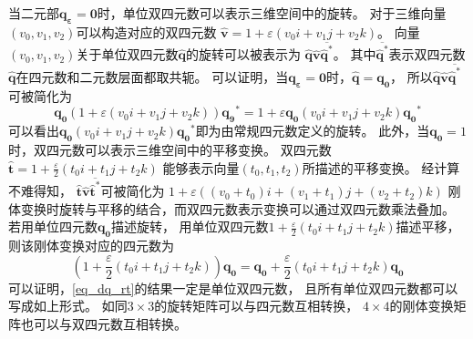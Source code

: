 当二元部$\bm{q_{\varepsilon}}=\bm{0}$时，单位双四元数可以表示三维空间中的旋转。
对于三维向量$(v_0,v_1,v_2)$可以构造对应的双四元数
$\hat{\bm{v}}=1 + \varepsilon (v_0i + v_1j + v_2k)$。
向量$(v_0,v_1,v_2)$关于单位双四元数$\hat{\bm{q}}$的旋转可以被表示为
$\hat{\bm{q}} \hat{\bm{v}} \overline{\hat{\bm{q}}^*}$。
其中$\overline{\hat{\bm{q}}^*}$表示双四元数$\hat{\bm{q}}$在四元数和二元数层面都取共轭。
可以证明，当$\bm{q_{\varepsilon}}=\bm{0}$时，$\hat{\bm{q}}=\bm{q_0}$，
所以$\hat{\bm{q}} \hat{\bm{v}} \overline{\hat{\bm{q}}^*}$可被简化为
\begin{equation}
    \bm{q_0}
    (
        1 + \varepsilon (v_0i + v_1j + v_2k)
    )
    \bm{q_9}^*
    =
    1 + \varepsilon \bm{q_0}(v_0i + v_1j + v_2k)\bm{q_0}^*
\end{equation}
可以看出$\bm{q_0}(v_0i + v_1j + v_2k)\bm{q_0}^*$即为由常规四元数定义的旋转。
此外，当$\bm{q_0} = 1$时，双四元数可以表示三维空间中的平移变换。
双四元数$\hat{\bm{t}} = 1 + \frac{\varepsilon}{2} (t_0i + t_1j + t_2k)$
能够表示向量$(t_0,t_1,t_2)$所描述的平移变换。
经计算不难得知，
$\hat{\bm{t}} \hat{\bm{v}} \overline{\hat{\bm{t}}^*}$可被简化为
$
1 + \varepsilon (
        (v_0 + t_0)i +
        (v_1 + t_1)j +
        (v_2 + t_2)k
    )
$
刚体变换时旋转与平移的结合，而双四元数表示变换可以通过双四元数乘法叠加。
若用单位四元数$\bm{q_0}$描述旋转，
用单位双四元数$1 + \frac{\varepsilon}{2} (t_0i + t_1j + t_2k)$描述平移，
则该刚体变换对应的四元数为
\begin{equation}
    \label{eq_dq_rt}
    (1 + \frac{\varepsilon}{2} (t_0i + t_1j + t_2k))
    \bm{q_0}
    =
    \bm{q_0} + \frac{\varepsilon}{2} (t_0i + t_1j + t_2k)\bm{q_0}
\end{equation}
可以证明，\ref{eq_dq_rt}的结果一定是单位双四元数，
且所有单位双四元数都可以写成如上形式。
如同$3 \times 3$的旋转矩阵可以与四元数互相转换，
$4 \times 4$的刚体变换矩阵也可以与双四元数互相转换。

